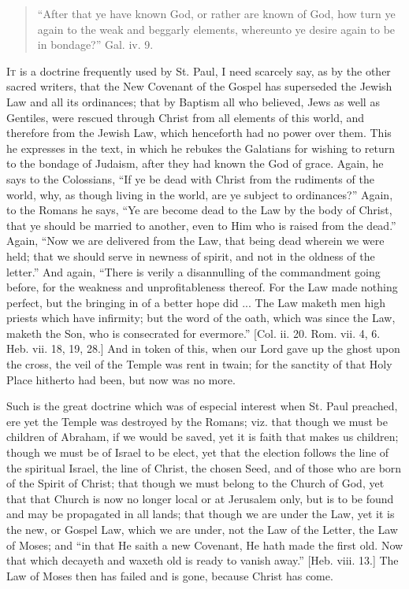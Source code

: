 \begin{quote}

``After that ye have known God, or rather are known of God,
how turn ye again to the weak and beggarly elements, whereunto ye
desire again to be in bondage?'' Gal. iv. 9.

\end{quote}

I\textsc{t} is a doctrine frequently used by St. Paul, I need scarcely say,
as by the other sacred writers, that the New Covenant of the Gospel
has superseded the Jewish Law and all its ordinances; that by Baptism
all who believed, Jews as well as Gentiles, were rescued through
Christ from all elements of this world, and therefore from the Jewish
Law, which henceforth had no power over them. This he expresses in the
text, in which he rebukes the Galatians for wishing to return to the
bondage of Judaism, after they had known the God of grace. Again, he
says to the Colossians, ``If ye be dead with Christ from the
rudiments of the world, why, as though living in the world, are ye
subject to ordinances?'' Again, to the Romans he says, ``Ye
are become dead to the Law by the body of Christ, that ye should be
married to another, even to Him who is raised from the dead.''
Again, ``Now we are delivered from the Law, that being dead
wherein we were held; that we should serve in newness of spirit, and
not in the oldness of the letter.'' And again, ``There is
verily a disannulling of the commandment going before, for the
weakness and unprofitableness thereof. For the Law made nothing
perfect, but the bringing in of a better hope did ... The Law maketh
men high priests which have infirmity; but the word of the oath, which
was since the Law, maketh the Son, who is consecrated for
evermore.'' [Col. ii. 20. Rom. vii. 4, 6. Heb. vii. 18, 19, 28.]
And in token of this, when our Lord gave up the ghost upon the cross,
the veil of the Temple was rent in twain; for the sanctity of that
Holy Place hitherto had been, but now was no more.

Such is the great doctrine which was of especial interest when St.
Paul preached, ere yet the Temple was destroyed by the Romans; viz.
that though we must be children of Abraham, if we would be saved, yet
it is faith that makes us children; though we must be of Israel to be
elect, yet that the election follows the line of the spiritual Israel,
the line of Christ, the chosen Seed, and of those who are born of the
Spirit of Christ; that though we must belong to the Church of God, yet
that that Church is now no longer local or at Jerusalem only, but is
to be found and may be propagated in all lands; that though we are
under the Law, yet it is the new, or Gospel Law, which we are under,
not the Law of the Letter, the Law of Moses; and ``in that He
saith a new Covenant, He hath made the first old. Now that which
decayeth and waxeth old is ready to vanish away.'' [Heb. viii.
13.] The Law of Moses then has failed and is gone, because Christ has
come.

